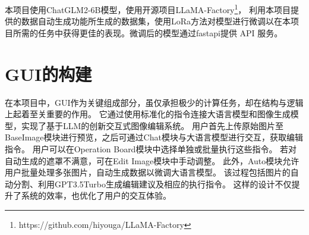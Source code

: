 \documentclass[a4paper,AutoFakeBold,oneside,12pt]{book}
\begin{document}
本项目使用ChatGLM2-6B模型，使用开源项目LLaMA-Factory\footnote{https://github.com/hiyouga/LLaMA-Factory}，
利用本项目提供的数据自动生成功能所生成的数据集，使用LoRa\cite{hu2021lora}方法对模型进行微调以在本项目所需的任务中获得更佳的表现。微调后的模型通过fastapi提供 API 服务。


\chapter{GUI的构建} %
在本项目中，GUI作为关键组成部分，虽仅承担极少的计算任务，却在结构与逻辑上起着至关重要的作用。
它通过使用标准化的指令连接大语言模型和图像生成模型，实现了基于LLM的创新交互式图像编辑系统。
用户首先上传原始图片至BaseImage模块进行预览，之后可通过Chat模块与大语言模型进行交互，获取编辑指令。
用户可以在Operation Board模块中选择单独或批量执行这些指令。
若对自动生成的遮罩不满意，可在Edit Image模块中手动调整。
此外，Auto模块允许用户批量处理多张图片，自动生成数据以微调大语言模型。
该过程包括图片的自动分割、利用GPT3.5Turbo生成编辑建议及相应的执行指令。
这样的设计不仅提升了系统的效率，也优化了用户的交互体验。
\end{document}
